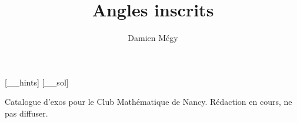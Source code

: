



\def\bio{}


\newcommand{\deuxSecantes}{
\tkzDefPoint(0,0){O}
\tkzDrawCircle(O,A)
\tkzInterLL(B,C)(A,D)\tkzGetPoint{P}
\tkzDrawSegments(P,A P,B)
\tkzDrawPolygon[very thick](A,B,C,D)
}

\newcommand{\quatreSecantes}{
\tkzDefPoint(0,0){O}
\tkzDrawCircle(O,A)
\tkzInterLL(B,C)(A,D)\tkzGetPoint{P}
\tkzInterLL(A,B)(C,D)\tkzGetPoint{Q}
\tkzDrawSegments(P,C P,D Q,B Q,C)
\tkzDrawPolygon[very thick](A,B,C,D)
}




[_\jobname_hints]
[_\jobname_sol]


\title{Angles inscrits}
\author{Damien Mégy}
\maketitle

Catalogue d'exos  pour le Club Mathématique de Nancy. Rédaction en cours, ne pas diffuser. 





\indications
\correction



